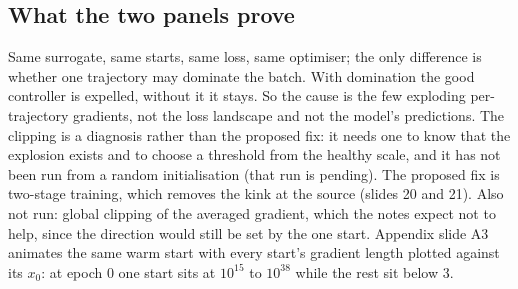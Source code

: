 \documentclass[11pt]{article}
\begin{document}
\subsection{What the two panels prove}
Same surrogate, same starts, same loss, same optimiser; the only difference is whether one trajectory may dominate the batch. With domination the good controller is expelled, without it it stays. So the cause is the few exploding per-trajectory gradients, not the loss landscape and not the model's predictions. The clipping is a diagnosis rather than the proposed fix: it needs one to know that the explosion exists and to choose a threshold from the healthy scale, and it has not been run from a random initialisation (that run is pending). The proposed fix is two-stage training, which removes the kink at the source (slides 20 and 21). Also not run: global clipping of the averaged gradient, which the notes expect not to help, since the direction would still be set by the one start. Appendix slide A3 animates the same warm start with every start's gradient length plotted against its $x_0$: at epoch 0 one start sits at $10^{15}$ to $10^{38}$ while the rest sit below 3.
\end{document}
